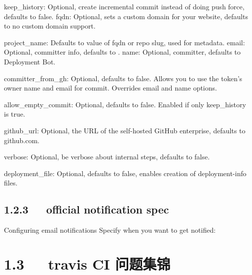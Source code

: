 \documentclass[letterpaper,12pt,english]{sphinxmanual}
\begin{document}
keep\_history: Optional, create incremental commit instead of doing push force, defaults to false.
fqdn: Optional, sets a custom domain for your website, defaults to no custom domain support.

project\_name: Defaults to value of fqdn or repo slug, used for metadata.
email: Optional, committer info, defaults to .
name: Optional, committer, defaults to Deployment Bot.

committer\_from\_gh: Optional, defaults to false. Allows you to use the token’s owner name and email for commit. Overrides email and name options.

allow\_empty\_commit: Optional, defaults to false. Enabled if only keep\_history is true.

github\_url: Optional, the URL of the self-hosted GitHub enterprise, defaults to github.com.

verbose: Optional, be verbose about internal steps, defaults to false.

deployment\_file: Optional, defaults to false, enables creation of deployment-info files.


\subsection{1.2.3   official notification spec}
\label{\detokenize{001software/001install/001._u7f51_u7ad9/travisCI:official-notification-spec}}
Configuring email notifications
Specify when you want to get notified:

\begin{sphinxVerbatim}[commandchars=\\\{\}]
       
       
      
      
\end{sphinxVerbatim}


\section{1.3   travis CI 问题集锦}
\label{\detokenize{001software/001install/001._u7f51_u7ad9/travisCI:id3}}
\end{document}
